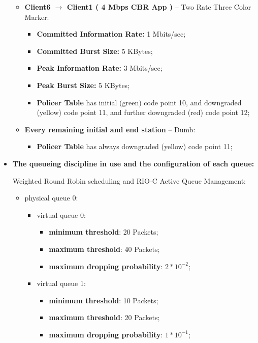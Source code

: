 \documentclass[conference,compsoc]{IEEEtran}
\begin{document}
\begin{itemize}
\begin{itemize}
			\item \textbf{Client6 $\rightarrow$ Client1  ( 4 Mbps CBR App )} -- Two Rate Three Color Marker:
   	  	\begin{itemize}
   	 	 \item \textbf{Committed Information Rate:} 1 Mbits/sec;
   		  \item \textbf{Committed Burst Size:} 5 KBytes;
		    \item \textbf{Peak Information Rate:} 3 Mbits/sec;
		     \item \textbf{Peak Burst Size:} 5 KBytes;
  		   \item \textbf{Policer Table} has initial (green) code point 10, and downgraded (yellow) code point 11, and further downgraded (red) code point 12;
     		\end{itemize}
     
     \item \textbf{Every remaining initial and end station} -- Dumb:
     \begin{itemize}
     \item \textbf{Policer Table} has always downgraded (yellow) code point 11;
     \end{itemize}
     \end{itemize}

     \vspace{5mm}
     \item \textbf{The queueing discipline in use and the configuration of each queue:}\par
     Weighted Round Robin scheduling and RIO-C Active Queue Management: \par 
     \begin{itemize}
     \item physical queue 0:
     \begin{itemize}
     	\item virtual queue 0:
     	\begin{itemize}
     		\item \textbf{minimum threshold}: 20 Packets;
		     \item \textbf{maximum threshold}: 40 Packets;
		     \item \textbf{maximum dropping probability}: $2 * 10^{-2}$;
         \end{itemize}
    	 \item virtual queue 1:
   	  \begin{itemize}
     			\item \textbf{minimum threshold}: 10 Packets;
 			    \item \textbf{maximum threshold}: 20 Packets;
   			  \item \textbf{maximum dropping probability}: $1 * 10^{-1}$;
  	   \end{itemize}
	   

\end{itemize}
\end{itemize}
\end{itemize}
\end{document}
